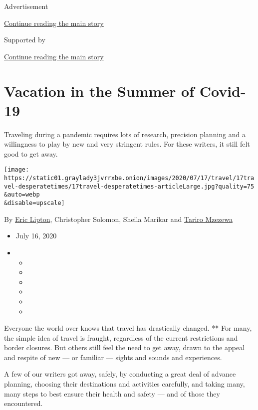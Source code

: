 Advertisement

\protect\hyperlink{after-top}{Continue reading the main story}

Supported by

\protect\hyperlink{after-sponsor}{Continue reading the main story}

\hypertarget{vacation-in-the-summer-of-covid-19}{%
\section{Vacation in the Summer of
Covid-19}\label{vacation-in-the-summer-of-covid-19}}

Traveling during a pandemic requires lots of research, precision
planning and a willingness to play by new and very stringent rules. For
these writers, it still felt good to get away.

\texttt{[image: https://static01.graylady3jvrrxbe.onion/images/2020/07/17/travel/17travel-desperatetimes/17travel-desperatetimes-articleLarge.jpg?quality=75\\\&auto=webp\\\&disable=upscale]}

By \href{https://www.nytimes3xbfgragh.onion/by/eric-lipton}{Eric
Lipton}, Christopher Solomon, Sheila Marikar and
\href{https://www.nytimes3xbfgragh.onion/by/tariro-mzezewa}{Tariro
Mzezewa}

\begin{itemize}
\item
  July 16, 2020
\item
  \begin{itemize}
  \item
  \item
  \item
  \item
  \item
  \item
  \end{itemize}
\end{itemize}

Everyone the world over knows that travel has drastically changed. **
For many, the simple idea of travel is fraught, regardless of the
current restrictions and border closures. But others still feel the need
to get away, drawn to the appeal and respite of new --- or familiar ---
sights and sounds and experiences.

A few of our writers got away, safely, by conducting a great deal of
advance planning, choosing their destinations and activities carefully,
and taking many, many steps to best ensure their health and safety ---
and of those they encountered.

